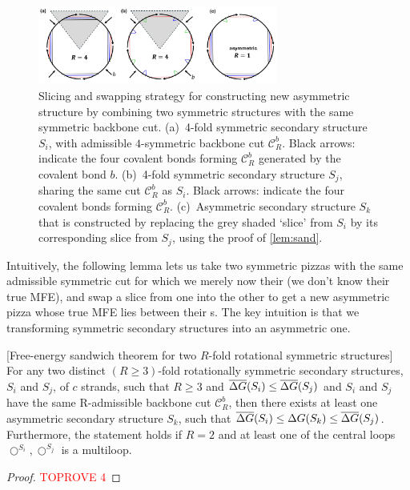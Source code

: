\begin{figure}[t]
	\centering\includegraphics[width=0.7\textwidth]{figures/sand.jpg}
	\caption{Slicing and swapping strategy for constructing new asymmetric structure by combining two symmetric structures with the same symmetric backbone cut. 
		(a)~4-fold symmetric secondary structure $S_i$, with admissible $4$-symmetric backbone cut $\mathcal{C}_R^b$.
		Black arrows: indicate the four covalent bonds forming $\mathcal{C}_R^b$ generated by the covalent bond $b$. 
		(b)~4-fold symmetric secondary structure $S_j$, sharing the same cut $\mathcal{C}_R^b$ as $S_i$.
		Black arrows: indicate the four covalent bonds forming $\mathcal{C}_R^b$. 
		(c)~Asymmetric secondary structure $S_k$ that is constructed by replacing the grey shaded `slice' from $S_i$ by its corresponding slice from $S_j$, using the proof of  \cref{lem:sand}. 
	}\label{fig:sand}
\end{figure}



Intuitively, the following lemma lets us take two symmetric pizzas with the same admissible symmetric cut for which we merely now their \snMFE (we don't know their true MFE), and swap a slice from one into the other to get a new asymmetric pizza whose true MFE lies between their {\snMFE}s. The key intuition is that we transforming symmetric secondary structures into an  asymmetric one. 

\begin{lemma}\label{lem:sand}[Free-energy sandwich theorem for two $R$-fold rotational symmetric  structures]
	For any two distinct $(R \geq 3)$-fold rotationally symmetric secondary structures, $S_i$ and $S_j$, of $c$ strands, such that $R \geq 3$ and $\overline{\Delta G}(S_i) \leq \overline{\Delta G}(S_j)$ and $S_i$ and $S_j$ have the same R-admissible backbone cut $\mathcal{C}_R^b$, then there exists at least one asymmetric secondary structure $S_k$, such that $\overline{\Delta G}(S_i) \leq \Delta G(S_k) \leq \overline{\Delta G}(S_j)$.  Furthermore, the statement holds if $R=2$ and at least one of the central loops  $\bigcirc^{S_i},  \bigcirc^{S_j}$  is a multiloop. 
\end{lemma}

\begin{proof}\textcolor{red}{TOPROVE 4}\end{proof}

